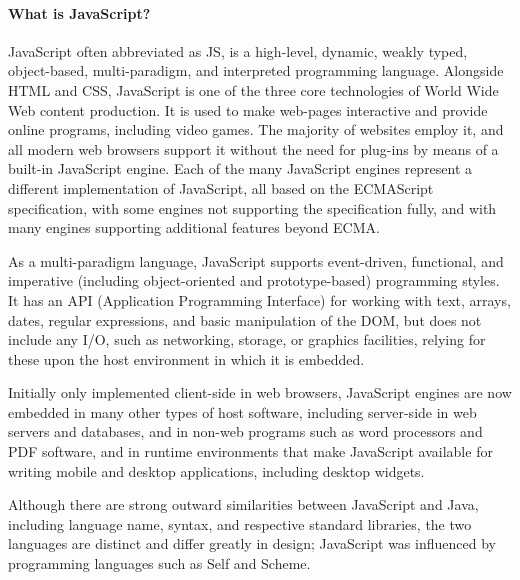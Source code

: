\documentclass{article}
\begin{document}
\paragraph{What is JavaScript?}
JavaScript often abbreviated as JS, is a high-level, dynamic, weakly typed, object-based, multi-paradigm, and interpreted programming language. Alongside HTML and CSS, JavaScript is one of the three core technologies of World Wide Web content production. It is used to make web-pages interactive and provide online programs, including video games. The majority of websites employ it, and all modern web browsers support it without the need for plug-ins by means of a built-in JavaScript engine. Each of the many JavaScript engines represent a different implementation of JavaScript, all based on the ECMAScript specification, with some engines not supporting the specification fully, and with many engines supporting additional features beyond ECMA.

As a multi-paradigm language, JavaScript supports event-driven, functional, and imperative (including object-oriented and prototype-based) programming styles. It has an API (Application Programming Interface) for working with text, arrays, dates, regular expressions, and basic manipulation of the DOM, but does not include any I/O, such as networking, storage, or graphics facilities, relying for these upon the host environment in which it is embedded.

Initially only implemented client-side in web browsers, JavaScript engines are now embedded in many other types of host software, including server-side in web servers and databases, and in non-web programs such as word processors and PDF software, and in runtime environments that make JavaScript available for writing mobile and desktop applications, including desktop widgets.

Although there are strong outward similarities between JavaScript and Java, including language name, syntax, and respective standard libraries, the two languages are distinct and differ greatly in design; JavaScript was influenced by programming languages such as Self and Scheme.
\end{document}
